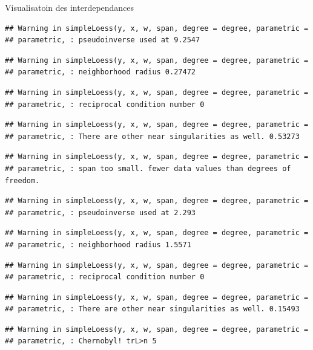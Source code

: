 \documentclass[11pt,ignorenonframetext,]{beamer}
\begin{document}
\begin{frame}[fragile]{Visualisatoin des interdependances}
\begin{verbatim}
## Warning in simpleLoess(y, x, w, span, degree = degree, parametric =
## parametric, : pseudoinverse used at 9.2547
\end{verbatim}

\begin{verbatim}
## Warning in simpleLoess(y, x, w, span, degree = degree, parametric =
## parametric, : neighborhood radius 0.27472
\end{verbatim}

\begin{verbatim}
## Warning in simpleLoess(y, x, w, span, degree = degree, parametric =
## parametric, : reciprocal condition number 0
\end{verbatim}

\begin{verbatim}
## Warning in simpleLoess(y, x, w, span, degree = degree, parametric =
## parametric, : There are other near singularities as well. 0.53273
\end{verbatim}

\begin{verbatim}
## Warning in simpleLoess(y, x, w, span, degree = degree, parametric =
## parametric, : span too small. fewer data values than degrees of freedom.
\end{verbatim}

\begin{verbatim}
## Warning in simpleLoess(y, x, w, span, degree = degree, parametric =
## parametric, : pseudoinverse used at 2.293
\end{verbatim}

\begin{verbatim}
## Warning in simpleLoess(y, x, w, span, degree = degree, parametric =
## parametric, : neighborhood radius 1.5571
\end{verbatim}

\begin{verbatim}
## Warning in simpleLoess(y, x, w, span, degree = degree, parametric =
## parametric, : reciprocal condition number 0
\end{verbatim}

\begin{verbatim}
## Warning in simpleLoess(y, x, w, span, degree = degree, parametric =
## parametric, : There are other near singularities as well. 0.15493
\end{verbatim}

\begin{verbatim}
## Warning in simpleLoess(y, x, w, span, degree = degree, parametric =
## parametric, : Chernobyl! trL>n 5


\end{verbatim}
\end{frame}
\end{document}
